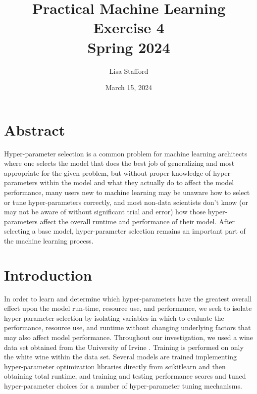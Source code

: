 \documentclass[titlepage]{article}
\title{%
	Practical Machine Learning\\
	
	\vspace*{2em}
	\LARGE Exercise 4\\
	Spring 2024}
\author{Lisa Stafford}
\date{March 15, 2024}
\begin{document}
	\setlength\parindent{0pt}
	
	\maketitle
	
	\section*{Abstract}
	Hyper-parameter selection is a common problem for machine learning architects where one selects the model that does the best job of generalizing and most appropriate for the given problem, but without proper knowledge of hyper-parameters within the model and what they actually do to affect the model performance, many users new to machine learning may be unaware how to select or tune hyper-parameters correctly, and most non-data scientists don't know (or may not be aware of without significant trial and error) how those hyper-parameters affect the overall runtime and performance of their model.  After selecting a base model, hyper-parameter selection remains an important part of the machine learning process.  
	
	\section*{Introduction}
	In order to learn and determine which hyper-parameters have the greatest overall effect upon the model run-time, resource use, and performance, we seek to isolate hyper-parameter selection by isolating variables in which to evaluate the performance, resource use, and runtime without changing underlying factors that may also affect model performance.  Throughout our investigation, we used a wine data set obtained from the University of Irvine \cite{dataset}. Training is performed on only the white wine within the data set.  Several models are trained implementing hyper-parameter optimization libraries directly from scikitlearn \cite{scikitlearn} and then obtaining total runtime, and training and testing performance scores and tuned hyper-parameter choices for a number of hyper-parameter tuning mechanisms.  
	
\end{document}
